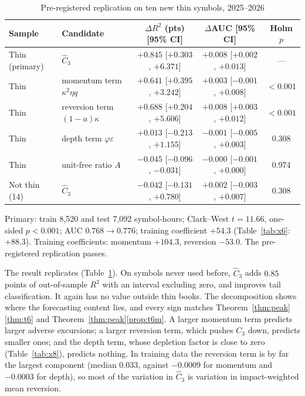 \documentclass[12pt]{article}
\theoremstyle{definition}
\theoremstyle{remark}
\begin{document}
\begin{table}[t]\centering
\begin{threeparttable}
\caption{Pre-registered replication on ten new thin symbols, 2025--2026}\label{tab:y6}
\small\setlength{\tabcolsep}{4pt}
\begin{tabular}{llccc}
\toprule
Sample & Candidate & $\Delta R^2$ (pts) [95\% CI] & $\Delta$AUC [95\% CI] & Holm $p$\\
\midrule
Thin (primary) & $\hat C_3$ & $+0.845$ [$+0.303$, $+6.371$] & $+0.008$ [$+0.002$, $+0.013$] & ---\\
Thin & momentum term $\kappa^2\eta q$ & $+0.641$ [$+0.395$, $+3.242$] & $+0.003$ [$-0.001$, $+0.008$] & $<0.001$\\
Thin & reversion term $(1-a)\kappa$ & $+0.688$ [$+0.204$, $+5.606$] & $+0.008$ [$+0.003$, $+0.012$] & $<0.001$\\
Thin & depth term $\varphi\varepsilon$ & $+0.013$ [$-0.213$, $+1.155$] & $-0.001$ [$-0.005$, $+0.003$] & 0.308\\
Thin & unit-free ratio $A$ & $-0.045$ [$-0.096$, $-0.031$] & $-0.000$ [$-0.001$, $+0.000$] & 0.974\\
Not thin (14) & $\hat C_3$ & $-0.042$ [$-0.131$, $+0.780$] & $+0.002$ [$-0.003$, $+0.007$] & 0.308\\
\bottomrule
\end{tabular}
\begin{tablenotes}\footnotesize\item Primary: train 8{,}520 and test 7{,}092 symbol-hours; Clark--West $t=11.66$, one-sided $p<0.001$; AUC $0.768\to0.776$; training coefficient $+54.3$ (Table~\ref{tab:x6}: $+88.3$). Training coefficients: momentum $+104.3$, reversion $-53.0$. The pre-registered replication passes. \end{tablenotes}
\end{threeparttable}
\end{table}

The result replicates (Table~\ref{tab:y6}). On symbols never used before, $\hat C_3$ adds $0.85$ points of out-of-sample $R^2$ with an interval excluding zero, and improves tail classification. It again has no value outside thin books. The decomposition shows where the forecasting content lies, and every sign matches Theorem~\ref{thm:peak}\ref{thm:t6} and Theorem~\ref{thm:peak}\ref{prop:t6m}. A larger momentum term predicts larger adverse excursions; a larger reversion term, which pushes $C_3$ down, predicts smaller ones; and the depth term, whose depletion factor is close to zero (Table~\ref{tab:x8}), predicts nothing. In training data the reversion term is by far the largest component (median $0.033$, against $-0.0009$ for momentum and $-0.0003$ for depth), so most of the variation in $\hat C_3$ is variation in impact-weighted mean reversion.
\end{document}
